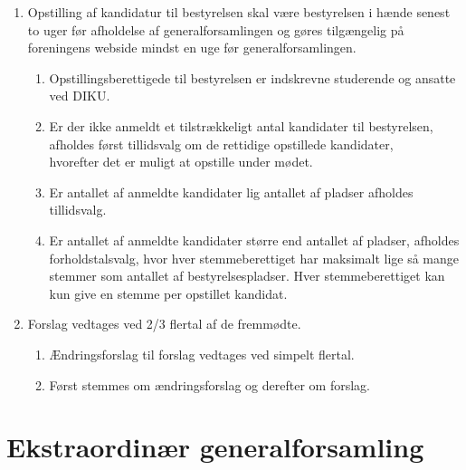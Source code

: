 \documentclass[a4paper]{article}
\newenvironment{stykenum}{
  \begin{enumerate}[%
    label=Stk.~\arabic*., ref=\theenumi~Stk.~\arabic*, start=2]
}{\end{enumerate}}
\begin{document}
\begin{enumerate}[resume*=afsnit]

\item Opstilling af kandidatur til bestyrelsen skal være bestyrelsen i hænde
senest to uger før afholdelse af generalforsamlingen og gøres tilgængelig på
foreningens webside mindst en uge før generalforsamlingen.

  \begin{stykenum}

  \item Opstillingsberettigede til bestyrelsen er indskrevne studerende og
        ansatte ved DIKU.

  \item Er der ikke anmeldt et tilstrækkeligt antal kandidater til bestyrelsen,
        afholdes først tillidsvalg om de rettidige opstillede kandidater,\\
        hvorefter det er muligt at opstille under mødet.

  \item Er antallet af anmeldte kandidater lig antallet af pladser afholdes
        tillidsvalg.

  \item Er antallet af anmeldte kandidater større end antallet af pladser,
        afholdes forholdstalsvalg, hvor hver stemmeberettiget har maksimalt lige
        så mange stemmer som antallet af bestyrelsespladser. Hver
        stemmeberettiget kan kun give en stemme per opstillet kandidat.

  \end{stykenum}

\item Forslag vedtages ved 2/3 flertal af de fremmødte.

  \begin{stykenum}

  \item Ændringsforslag til forslag vedtages ved simpelt flertal.

  \item Først stemmes om ændringsforslag og derefter om forslag.

  \end{stykenum}

\end{enumerate}


\section*{Ekstraordinær generalforsamling}
\end{document}
